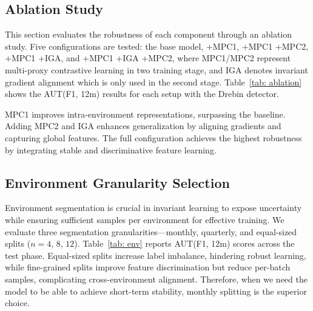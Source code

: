 

\subsection{Ablation Study}
This section evaluates the robustness of each component through an ablation study. Five configurations are tested: the base model, +MPC1, +MPC1 +MPC2, +MPC1 +IGA, and +MPC1 +IGA +MPC2, where MPC1/MPC2 represent multi-proxy contrastive learning in two training stage, and IGA denotes invariant gradient alignment which is only used in the second stage. Table~\ref{tab: ablation} shows the AUT(F1, 12m) results for each setup with the Drebin detector.

MPC1 improves intra-environment representations, surpassing the baseline. Adding MPC2 and IGA enhances generalization by aligning gradients and capturing global features. The full configuration achieves the highest robustness by integrating stable and discriminative feature learning.






\subsection{Environment Granularity Selection}
\label{env seg}
Environment segmentation is crucial in invariant learning to expose uncertainty while ensuring sufficient samples per environment for effective training. We evaluate three segmentation granularities—monthly, quarterly, and equal-sized splits ($n=4$, $8$, $12$). Table~\ref{tab: env} reports AUT(F1, 12m) scores across the test phase. Equal-sized splits increase label imbalance, hindering robust learning, while fine-grained splits improve feature discrimination but reduce per-batch samples, complicating cross-environment alignment. Therefore, when we need the model to be able to achieve short-term stability, monthly splitting is the superior choice.

